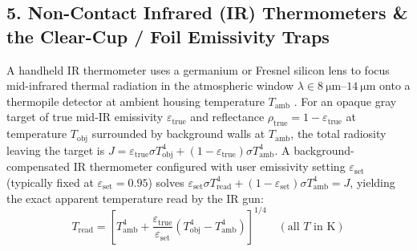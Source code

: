 \subsection{5. Non-Contact Infrared (IR) Thermometers \& the Clear-Cup / Foil Emissivity Traps}
A handheld IR thermometer uses a germanium or Fresnel silicon lens to focus mid-infrared thermal radiation in the atmospheric window $\lambda \in \SIrange{8}{14}{\micro\meter}$ onto a thermopile detector at ambient housing temperature $T_{\mathrm{amb}}$ . For an opaque gray target of true mid-IR emissivity $\varepsilon_{\mathrm{true}}$ and reflectance $\rho_{\mathrm{true}} = 1 - \varepsilon_{\mathrm{true}}$ at temperature $T_{\mathrm{obj}}$ surrounded by background walls at $T_{\mathrm{amb}}$, the total radiosity leaving the target is $J = \varepsilon_{\mathrm{true}}\sigma T_{\mathrm{obj}}^4 + (1 - \varepsilon_{\mathrm{true}})\sigma T_{\mathrm{amb}}^4$. A background-compensated IR thermometer configured with user emissivity setting $\varepsilon_{\mathrm{set}}$ (typically fixed at $\varepsilon_{\mathrm{set}} = 0.95$) solves $\varepsilon_{\mathrm{set}}\sigma T_{\mathrm{read}}^4 + (1 - \varepsilon_{\mathrm{set}})\sigma T_{\mathrm{amb}}^4 = J$, yielding the exact apparent temperature read by the IR gun:
\begin{equation}\label{eq:17:ir}
  \boxed{T_{\mathrm{read}} = \left[T_{\mathrm{amb}}^4 + \frac{\varepsilon_{\mathrm{true}}}{\varepsilon_{\mathrm{set}}}\left(T_{\mathrm{obj}}^4 - T_{\mathrm{amb}}^4\right)\right]^{1/4} \quad (\text{all }T\text{ in }\si{\kelvin})}
\end{equation}

